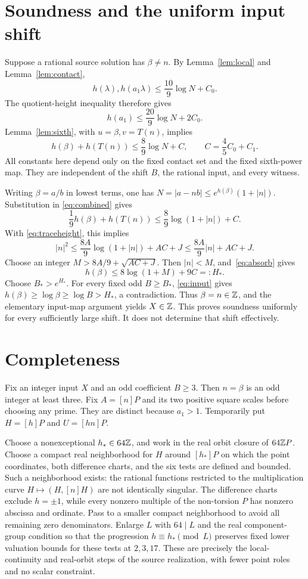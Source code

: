 \documentclass[11pt,a4paper]{article}
\begin{document}
\section{Soundness and the uniform input shift}

Suppose a rational source solution has $\beta\ne n$. By
Lemma~\ref{lem:local} and Lemma~\ref{lem:contact},
\[
 h(\lambda),h(a_1\lambda)\le\frac{10}{9}\log N+C_0.
\]
The quotient-height inequality therefore gives
\[
 h(a_1)\le\frac{20}{9}\log N+2C_0.
\]
Lemma~\ref{lem:sixth}, with $u=\beta,v=T(n)$, implies
\begin{equation}\label{eq:combined}
 h(\beta)+h(T(n))\le\frac89\log N+C,
 \qquad C=\frac45C_0+C_1.
\end{equation}
All constants here depend only on the fixed contact set and the
fixed sixth-power map. They are independent of the shift $B$,
the rational input, and every witness.

Writing $\beta=a/b$ in lowest terms, one has
$N=|a-nb|\le e^{h(\beta)}(1+|n|)$. Substitution in
\eqref{eq:combined} gives
\begin{equation}\label{eq:absorb}
 \frac19h(\beta)+h(T(n))
                  \le\frac89\log(1+|n|)+C.
\end{equation}
With \eqref{eq:traceheight}, this implies
\[
 |n|^2\le\frac{8A}{9}\log(1+|n|)+AC+J
       \le\frac{8A}{9}|n|+AC+J.
\]
Choose an integer $M>8A/9+\sqrt{AC+J}$. Then $|n|<M$,
and~\eqref{eq:absorb} gives
\[
                       h(\beta)\le8\log(1+M)+9C=:H_*.
\]
Choose $B_*>e^{H_*}$. For every fixed odd $B\ge B_*$,
\eqref{eq:input} gives $h(\beta)\ge\log\beta\ge\log B>H_*$,
a contradiction. Thus $\beta=n\in\mathbb Z$, and the elementary
input-map argument yields $X\in\mathbb Z$.
This proves soundness uniformly for every sufficiently large shift.
It does not determine that shift effectively.

\section{Completeness}\label{sec:complete}

Fix an integer input $X$ and an odd coefficient $B\ge3$.
Then $n=\beta$ is an odd integer at least three. Fix
$A=[n]P$ and its two positive square scales before choosing
any prime. They are distinct because $a_1>1$.
Temporarily put $H=[h]P$ and $U=[hn]P$.

Choose a nonexceptional $h_*\in64\mathbb Z$, and work in the real
orbit closure of $64\mathbb Z P$. Choose a compact real neighborhood
for $H$ around $[h_*]P$ on which the point coordinates, both difference charts,
and the six tests are defined and bounded. Such a neighborhood
exists: the rational functions restricted to the multiplication
curve $H\mapsto(H,[n]H)$ are not identically singular.
The difference charts exclude $h=\pm1$, while every nonzero
multiple of the non-torsion $P$ has nonzero abscissa and ordinate.
Pass to a smaller compact neighborhood to avoid all remaining
zero denominators. Enlarge $L$ with $64\mid L$ and the real
component-group condition so that the progression
$h\equiv h_*\pmod L$
preserves fixed lower valuation bounds for these tests at
$2,3,17$. These are precisely the local-continuity and real-orbit
steps of the source realization, with fewer point roles and no
scalar constraint.
\end{document}
